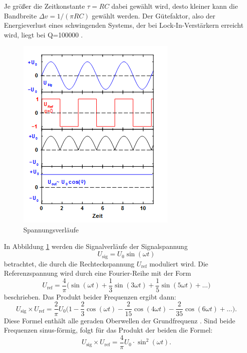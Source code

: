Je größer die Zeitkonstante $\tau =RC$ dabei gewählt wird, desto kleiner kann die
Bandbreite $\Delta v=1/(\pi RC)$ gewählt werden.
Der Gütefaktor, also der Energieverlust eines schwingenden Systems,
der bei Lock-In-Verstärkern erreicht wird, liegt bei Q=100000
\cite{303}.
\newpage
\begin{figure}[h]
  \centering
  \includegraphics{Bilder/Spannung.jpg}
  \caption{Spannungsverläufe}
  \label{fig:spannung}
\end{figure}
In Abbildung \ref{fig:spannung} werden die Signalverläufe der Signalspannung
\begin{equation}
  U_\text{sig}=U_0\sin(\omega t)
\end{equation}
betrachtet, die durch die Rechteckspannung $U_\text{ref}$ moduliert wird.
Die Referenzspannung wird durch eine Fourier-Reihe mit der Form
\begin{equation}
  U_\text{ref}=\frac{4}{\pi}\biggl(\sin(\omega t)+\frac{1}{3}\sin(3\omega t)
  +\frac{1}{5}\sin(5\omega t)+\dots\biggr)
\end{equation}
beschrieben. Das Produkt beider Frequenzen ergibt dann:
\begin{equation}
  U_\text{sig}\times U_\text{ref} =\frac{2}{\pi}U_0\biggl(1-\frac{2}{3}\cos(\omega t)
  -\frac{2}{15}\cos(4\omega t)-\frac{2}{35}\cos(6\omega t)+\dots\biggr).
\end{equation}
Diese Formel enthält alle geraden Oberwellen der Grundfrequenz \omega.
Sind beide Frequenzen sinus-förmig, folgt für das Produkt der beiden
die Formel:
\begin{equation}
  U_\text{sig}\times U_\text{ref}=\frac{4}{\pi}U_0 \cdot \sin^2(\omega t).
\end{equation}
